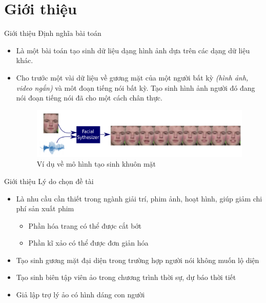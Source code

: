 \section{Giới thiệu}\label{sec:intro}
\frame{\tableofcontents[currentsection]}

\begin{frame}{Giới thiệu}
Định nghĩa bài toán
\begin{itemize}
    \item Là một bài toán tạo sinh dữ liệu dạng hình ảnh dựa trên các dạng dữ liệu khác.
    \item Cho trước một vài dữ liệu về gương mặt của một người bất kỳ \textit{(hình ảnh, video ngắn)} và môt đoạn tiếng nói bất kỳ. Tạo sinh hình ảnh người đó đang nói đoạn tiếng nói đã cho một cách chân thực.
\begin{figure}[H]
    \centering
    \includegraphics[width=13cm]{images/intro.png}
    \caption{Ví dụ về mô hình tạo sinh khuôn mặt}
    \label{fig:example}
\end{figure}
\end{itemize}
\end{frame}


\begin{frame}{Giới thiệu}
Lý do chọn đề tài
\begin{itemize}
    \item Là nhu cầu cần thiết trong ngành giải trí, phim ảnh, hoạt hình, giúp giảm chi phí sản xuất phim
    \begin{itemize}
        \item Phần hóa trang có thể được cắt bớt
        \item Phần kĩ xảo có thể được đơn giản hóa
    \end{itemize}
    \item Tạo sinh gương mặt đại diện trong trường hợp người nói không muốn lộ diện
    \item Tạo sinh biên tập viên ảo trong chương trình thời sự, dự báo thời tiết
    \item Giả lập trợ lý ảo có hình dáng con người
\end{itemize}
\end{frame}

